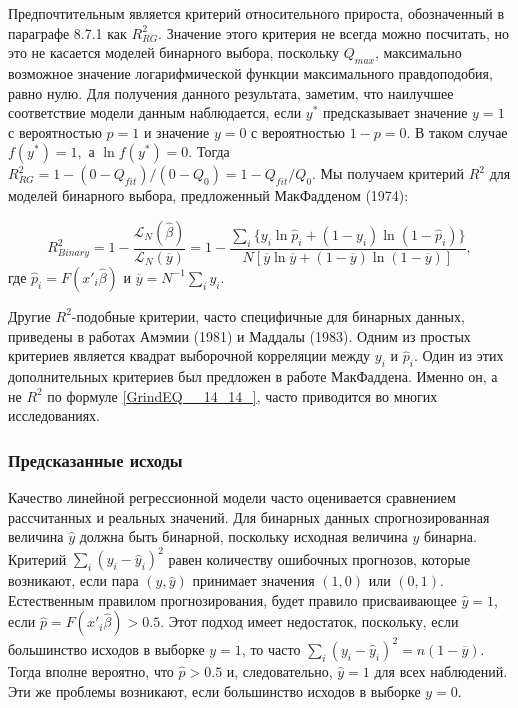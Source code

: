 Предпочтительным является критерий относительного прироста, обозначенный в параграфе 8.7.1 как $R^2_{RG}$. Значение этого критерия не всегда можно посчитать,  но это не касается моделей бинарного выбора,  поскольку $Q_{max}$,  максимально возможное значение логарифмической функции максимального правдоподобия,  равно нулю. Для получения данного результата, заметим, что наилучшее соответствие модели данным наблюдается, если $y^*$  предсказывает значение $y=1$ с вероятностью $p=1$ и значение $y=0$ с вероятностью $1-p=0$. В таком случае $f(y^*)=1, $ а $\ln f(y^*)=0$. Тогда $R^2_{RG}=1-(0-Q_{fit})/(0-Q_0)=1-Q_{fit}/Q_0$. Мы получаем критерий $R^2$ для моделей бинарного выбора,  предложенный МакФадденом  (1974): 

\begin{equation} 
\label{GrindEQ__14_14_} 
R^2_{Binary} = 1 - \frac{\mathcal{L}_N (\widehat\beta)}{\mathcal{L}_N (\overline{y})} = 1-\frac{\sum_i \{y_i \ln  \hat{p}_i+(1-y_i) \ln (1-\hat{p}_i) \}}{N[\overline{y} \ln \overline{y} + (1-\overline{y}) \ln  (1-\overline{y})]},  
\end{equation} 
где $\hat{p}_i=F(x'_i\widehat\beta)$ и $\overline{y}=N^{-1}\sum_i y_i.$

Другие $R^2$-подобные критерии,  часто специфичные для бинарных данных,  приведены в работах Амэмии  (1981)  и Маддалы  (1983). Одним из простых критериев является квадрат выборочной  корреляции между $y_i$ и $\hat{p}_i$. Один из этих дополнительных критериев был предложен в работе МакФаддена. Именно он,  а не $R^2$ по формуле \eqref{GrindEQ__14_14_}, часто приводится во многих исследованиях.

\subsubsection*{Предсказанные исходы}

Качество линейной регрессионной модели часто оценивается сравнением рассчитанных и реальных значений. Для бинарных данных спрогнозированная величина $\hat{y}$ должна быть бинарной,  поскольку исходная величина $y$ бинарна. Критерий $\sum_i (y_i - \hat{y}_i)^2$ равен количеству ошибочных прогнозов,  которые возникают,  если пара $(y,  \hat{y})$ принимает  значения $(1, 0)$ или $(0, 1)$. Естественным  правилом прогнозирования, будет правило присваивающее  $\hat{y}=1$,  если $\hat{p} = F(x'_i \widehat\beta) > 0.5$. Этот подход имеет недостаток,  поскольку,  если большинство исходов в выборке $y=1$,  то часто $\sum_i (y_i-\hat{y}_i)^2 = n(1-\overline{y})$. Тогда вполне вероятно,  что  $\hat{p} > 0.5$ и,  следовательно,  $\hat{y}=1$ для всех наблюдений. Эти же проблемы возникают,  если большинство исходов в выборке $y=0$.

